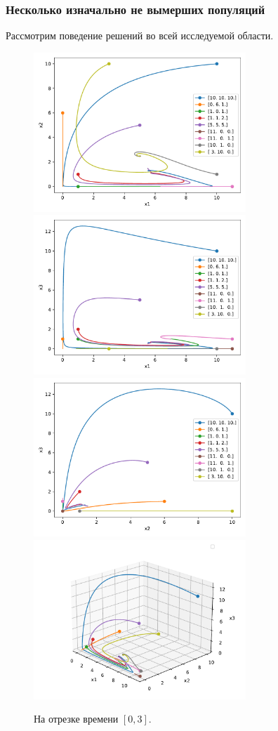     \subsubsection{Несколько изначально не вымерших популяций}
    Рассмотрим поведение решений во всей исследуемой области.
    \begin{figure}[H]
        \centering
        \includegraphics[width=8cm]{pictures/kx_12phase.pdf}
        \includegraphics[width=8cm]{pictures/kx_13phase.pdf}
        \includegraphics[width=8cm]{pictures/kx_23phase.pdf}
        \includegraphics[width=8cm]{pictures/kx_phase3.pdf}
        \caption{На отрезке времени \( [0, 3] \).} \label{k3d1}
    \end{figure}

